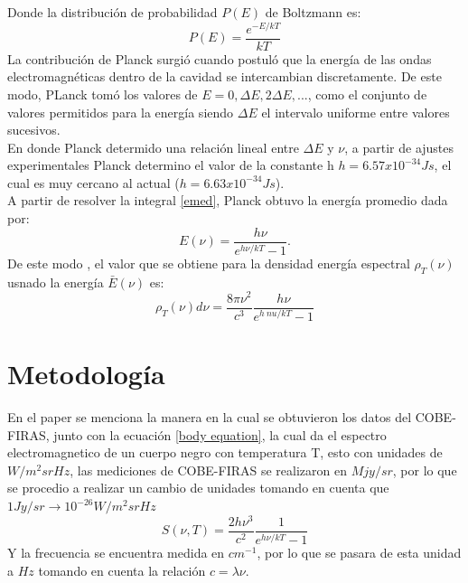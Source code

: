 \documentclass[12pt,letterpaper]{article}
\begin{document}
\begin{multicols}{2}
Donde la distribución de probabilidad $P(E)$ de Boltzmann es:
\begin{equation}
    P(E)=\frac{e^{-E/kT}}{kT}
\end{equation}
La contribución de Planck surgió cuando postuló que la energía de las ondas electromagnéticas dentro de la cavidad se intercambian discretamente. De este modo, PLanck tomó los valores de $E=0,\Delta E,2\Delta E,...$,
como el conjunto de valores permitidos para la energía siendo $\Delta E$ el intervalo uniforme entre valores sucesivos.\\
En donde Planck determido una relación lineal entre $\Delta E$ y $\nu$, a partir de ajustes experimentales Planck determino el valor de la constante h $h=6.57x10^{-34} Js$, el cual es muy cercano al actual ($h=6.63x10^{-34} Js$). \\
A partir de resolver la integral \ref{emed}, Planck obtuvo la energía promedio dada por:
\begin{equation}
    E(\nu) = \frac{h\nu}{e^{h\nu/kT}-1}.
\end{equation}
De este modo , el valor que se obtiene para la densidad energía espectral $\rho_T(\nu)$ usnado la energía $\bar{E}(\nu)$ es:
\begin{equation}
    \rho_T(\nu) d\nu = \frac{8\pi \nu^2}{c^3} \frac{h \nu }{e^{h\ nu /kT}-1}
\end{equation}
\section*{Metodología}
En el paper \cite{Eccarelli1996} se menciona la manera en la cual se obtuvieron los datos del COBE-FIRAS, junto con la ecuación \ref{body equation}, la cual da el espectro electromagnetico de un cuerpo negro con temperatura T, esto con unidades de  $W/m^2srHz$, las mediciones de COBE-FIRAS se realizaron en $Mjy/sr$, por lo que se procedio a realizar un cambio de unidades tomando en cuenta que $1 Jy /sr \rightarrow 10^{-26} W/m^2 srHz $
\begin{equation}
S(\nu,T)= \frac{2h\nu^3}{c^2} \frac{1}{e^{h\nu/kT}-1}
\label{body equation}
\end{equation}
Y la frecuencia se encuentra medida en $cm^{-1}$, por lo que se pasara de esta unidad a $Hz$ tomando en cuenta la relación $c=\lambda \nu $.

\end{multicols}
\end{document}
